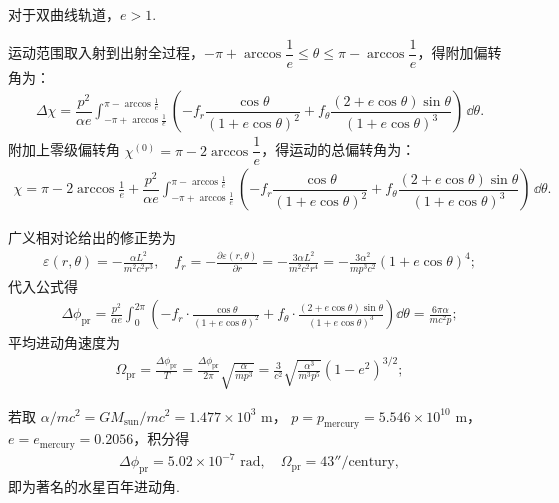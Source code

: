 对于双曲线轨道，\(e > 1\).

运动范围取入射到出射全过程，\(-\pi + \arccos \dfrac{1}{e} \leq \theta \leq \pi - \arccos \dfrac{1}{e}\)，得附加偏转角为：
\begin{align*}
	\Delta \chi = \dfrac{p^2}{\alpha e} \int_{-\pi + \arccos \frac{1}{e}}^{\pi - \arccos \frac{1}{e}} \left( -f_r \dfrac{\cos\theta}{(1 + e \cos\theta)^2} + f_{\theta} \dfrac{(2 + e \cos\theta) \sin\theta}{(1 + e \cos\theta)^3} \right) \, \dd \theta.
\end{align*}
附加上零级偏转角 \(\chi^{(0)} = \pi - 2 \arccos \dfrac{1}{e}\)，得运动的总偏转角为：
\begin{align*}
	\chi = \pi - 2 \arccos \frac{1}{e} + \dfrac{p^2}{\alpha e} \int_{-\pi + \arccos \frac{1}{e}}^{\pi - \arccos \frac{1}{e}} \left( -f_r \dfrac{\cos\theta}{(1 + e \cos\theta)^2} + f_{\theta} \dfrac{(2 + e \cos\theta) \sin\theta}{(1 + e \cos\theta)^3} \right) \, \dd \theta.
\end{align*}

\begin{exbox}
	广义相对论给出的修正势为
	\begin{align*}
		\varepsilon (r, \theta) = -\frac{\alpha  L^2}{m^2 c^2 r^3},
		\quad
		f_r = -\frac{\partial \varepsilon (r, \theta)}{\partial r} = -\frac{3 \alpha  L^2}{m^2 c^2 r^4} = -\frac{3 \alpha^2}{m p^3 c^2} (1 + e \cos  \theta)^4;
	\end{align*}
	代入公式得
	\begin{align*}
		\Delta\phi_{\text{pr}} = \frac{p^2}{\alpha e} \int_0^{2\pi} \left(
		-f_r \cdot \frac{\cos \theta}{(1 + e \cos \theta)^2}
		+
		f_\theta \cdot \frac{(2 + e \cos \theta) \sin \theta}{(1 + e \cos \theta)^3}
		\right) \dd \theta
		= \frac{6 \pi  \alpha}{m c^2 p};
	\end{align*}
	平均进动角速度为
	\begin{align*}
		\Omega_{\text{pr}} =
		\frac{\Delta\phi_{\text{pr}}}{T} =  \frac{\Delta\phi_{\text{pr}}}{2\pi}\sqrt{\frac{\alpha}{m p^3}}=
		\frac{3}{c^2} \sqrt{\frac{\alpha^3}{m^3 p^5}} (1 - e^2)^{3/2};
	\end{align*}

	若取 \(\alpha/mc^2 = G M_{\text{sun}}/mc^2 = 1.477 \times 10^3 \text{ m}\)，
	\(p = p_{\text{mercury}} = 5.546 \times 10^{10} \text{ m}\)，
	\(e = e_{\text{mercury}} = 0.2056\)，积分得
	\begin{align*}
		\Delta\phi_{\text{pr}} = 5.02 \times 10^{-7} \text{ rad}, \quad
		\Omega_{\text{pr}} = 43''/\text{century},
	\end{align*}
	即为著名的水星百年进动角.
\end{exbox}

